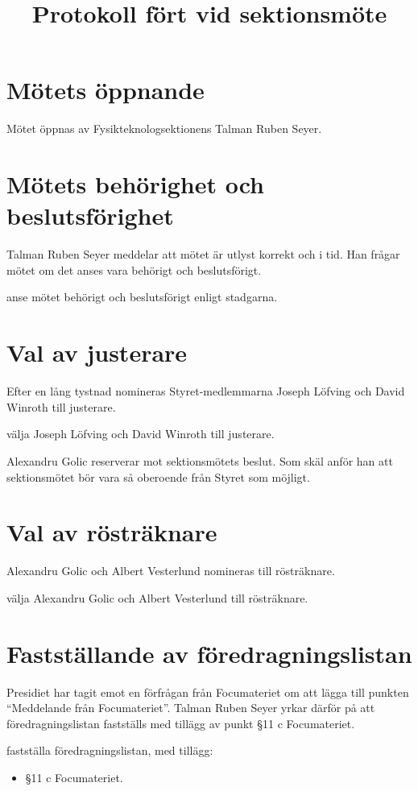 \documentclass[hidelinks]{../sektionsmote} %
\title{Protokoll fört vid sektionsmöte}
\begin{document}
\maketitle

\section{Mötets öppnande}
Mötet öppnas \tid av Fysikteknologsektionens Talman Ruben Seyer.


\section{Mötets behörighet och beslutsförighet}
Talman Ruben Seyer meddelar att mötet är utlyst korrekt och i tid.
Han frågar mötet om det anses vara behörigt och beslutsförigt.
\begin{beslut}
    \item anse mötet behörigt och beslutsförigt enligt stadgarna.
\end{beslut}


\section{Val av justerare}
Efter en lång tystnad nomineras Styret-medlemmarna Joseph Löfving och David Winroth till justerare.
\begin{beslut}
    \item välja Joseph Löfving och David Winroth till justerare.
\end{beslut}
Alexandru Golic reserverar mot sektionsmötets beslut.
Som skäl anför han att sektionsmötet bör vara så oberoende från Styret som möjligt.


\section{Val av rösträknare}
Alexandru Golic och Albert Vesterlund nomineras till rösträknare.
\begin{beslut}
    \item välja Alexandru Golic och Albert Vesterlund till rösträknare.
\end{beslut}


\section{Fastställande av föredragningslistan}
Presidiet har tagit emot en förfrågan från Focumateriet om att lägga till punkten \enquote{Meddelande från Focumateriet}.
Talman Ruben Seyer yrkar därför på att föredragningslistan fastställs med tillägg av punkt §11 c Focumateriet.
\begin{beslut}
    \item fastställa föredragningslistan, med tillägg: 
    \begin{itemize}
        \item §11 c Focumateriet.
    \end{itemize}
\end{beslut}
\end{document}
